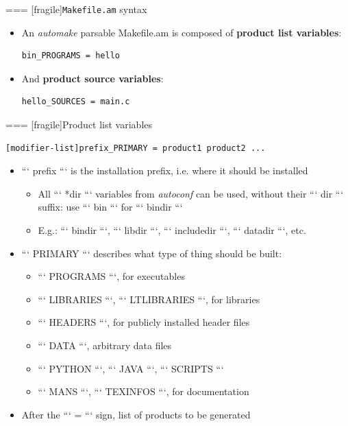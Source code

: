 === [fragile]{{\tt Makefile.am} syntax}
  \begin{itemize}
  \item An {\em automake} parsable Makefile.am is composed of {\bf
      product list variables}:
    \begin{block}{}
\begin{verbatim}
bin_PROGRAMS = hello
\end{verbatim}
\end{block}
  \item And {\bf product source variables}:
    \begin{block}{}
\begin{verbatim}
hello_SOURCES = main.c
\end{verbatim}
\end{block}

\end{itemize}


=== [fragile]{Product list variables}

    \begin{block}{}
{\small
\begin{verbatim}
[modifier-list]prefix_PRIMARY = product1 product2 ...
\end{verbatim}}
\end{block}

  \begin{itemize}

\item ``` prefix ``` is the installation prefix, i.e. where it should be
  installed
  \begin{itemize}
  \item All ``` *dir ``` variables from {\em autoconf} can be used,
    without their ``` dir ``` suffix: use ``` bin ``` for ``` bindir ```
  \item E.g.: ``` bindir ```, ``` libdir ```, ``` includedir ```,
    ``` datadir ```, etc.
  \end{itemize}

\item ``` PRIMARY ``` describes what type of thing should be built:
  \begin{itemize}
  \item ``` PROGRAMS ```, for executables
  \item ``` LIBRARIES ```, ``` LTLIBRARIES ```, for libraries
  \item ``` HEADERS ```, for publicly installed header files
  \item ``` DATA ```, arbitrary data files
  \item ``` PYTHON ```, ``` JAVA ```, ``` SCRIPTS ```
  \item ``` MANS ```, ``` TEXINFOS ```, for documentation
  \end{itemize}

\item After the ``` = ``` sign, list of products to be generated

\end{itemize}



